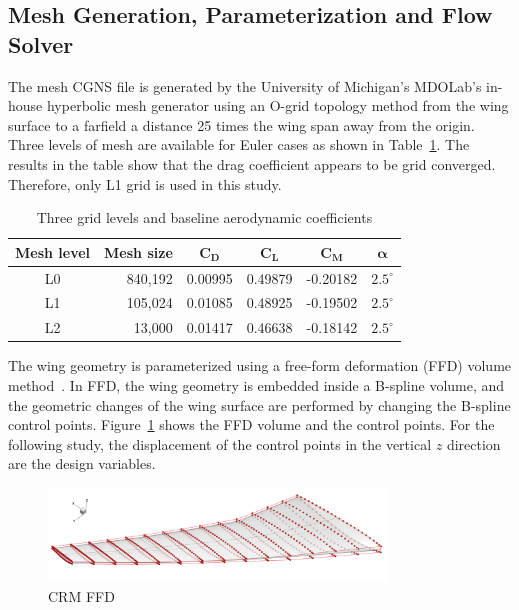 \subsection{Mesh Generation, Parameterization and Flow Solver}
The mesh CGNS file is generated by the University of Michigan's MDOLab's in-house hyperbolic mesh generator using an O-grid topology method from the wing surface to a farfield a distance 25 times the wing span away from the origin. Three levels of mesh are available for Euler cases as shown in Table~\ref{tab:euler_mesh}. 
The results in the table show that the drag coefficient appears to be grid converged. Therefore, only L1 grid is used in this study. 

\begin{table}[H]
  \begin{center}
    \caption{Three grid levels and baseline aerodynamic coefficients
    \label{tab:euler_mesh}}
  \begin{tabular}{ c r c c c c }
 \textbf{Mesh level}   &  \textbf{Mesh size}  & $\mathbf{C_D}$ & $\mathbf{C_L} $ & $\mathbf{C_M}$ & $\mathbf{\alpha}$  \\\hline
 L0                  &  840,192   & 0.00995   & 0.49879 & -0.20182  & $2.5^{\circ}$   \\
 L1                  &  105,024   & 0.01085   & 0.48925 & -0.19502    & $2.5^{\circ}$ \\
 L2 		      &   13,000    &  0.01417   & 0.46638    & -0.18142  &  	$2.5^{\circ}$ 	 
  \end{tabular}
  \end{center}
\end{table}

The wing geometry is parameterized using a free-form deformation (FFD) volume method~\cite{Kenway:2010:C}. In FFD, the wing geometry is embedded inside a B-spline volume, and the geometric changes of the wing surface are performed by changing the B-spline control points.
Figure~\ref{fig:crm_ffd} shows the FFD volume and the control points. For the following study, the displacement of the control points in the vertical $z$ direction are the design variables. 

 \begin{figure}[tbp]
  \centering
  \includegraphics[clip,width=0.8\textwidth]{./figs/chap7_aso/CRM-wing-FFD.png}%
  \caption{CRM FFD \label{fig:crm_ffd}}
\end{figure}

